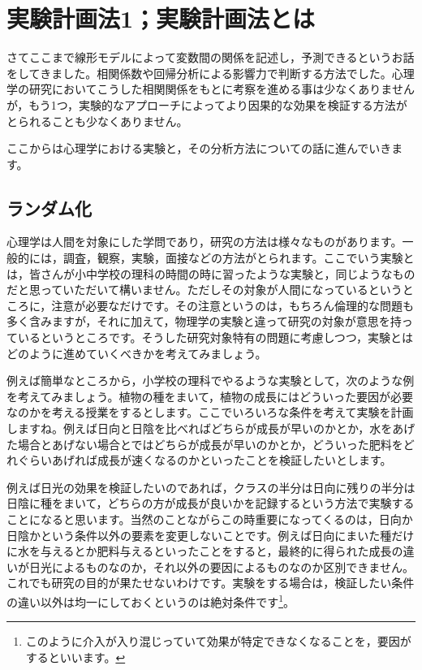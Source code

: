 \documentclass{ltjbook}
\begin{document}
 
\chapter{実験計画法1；実験計画法とは} 
\label{chapter12} 

さてここまで線形モデルによって変数間の関係を記述し，予測できるというお話をしてきました。相関係数や回帰分析による影響力で判断する方法でした。心理学の研究においてこうした相関関係をもとに考察を進める事は少なくありませんが，もう1つ，実験的なアプローチによってより因果的な効果を検証する方法がとられることも少なくありません。

ここからは心理学における実験と，その分析方法についての話に進んでいきます。


\section{ランダム化}
\label{RCT}
心理学は人間を対象にした学問であり，研究の方法は様々なものがあります。一般的には，調査，観察，実験，面接などの方法がとられます。ここでいう実験とは，皆さんが小中学校の理科の時間の時に習ったような実験と，同じようなものだと思っていただいて構いません。ただしその対象が人間になっているというところに，注意が必要なだけです。その注意というのは，もちろん倫理的な問題も多く含みますが，それに加えて，物理学の実験と違って研究の対象が意思を持っているというところです。そうした研究対象特有の問題に考慮しつつ，実験とはどのように進めていくべきかを考えてみましょう。

例えば簡単なところから，小学校の理科でやるような実験として，次のような例を考えてみましょう。植物の種をまいて，植物の成長にはどういった要因が必要なのかを考える授業をするとします。ここでいろいろな条件を考えて実験を計画しますね。例えば日向と日陰を比べればどちらが成長が早いのかとか，水をあげた場合とあげない場合とではどちらが成長が早いのかとか，どういった肥料をどれぐらいあげれば成長が速くなるのかといったことを検証したいとします。

例えば日光の効果を検証したいのであれば，クラスの半分は日向に残りの半分は日陰に種をまいて，どちらの方が成長が良いかを記録するという方法で実験することになると思います。当然のことながらこの時重要になってくるのは，日向か日陰かという条件以外の要素を変更しないことです。例えば日向にまいた種だけに水を与えるとか肥料与えるといったことをすると，最終的に得られた成長の違いが日光によるものなのか，それ以外の要因によるものなのか区別できません。これでも研究の目的が果たせないわけです。実験をする場合は，検証したい条件の違い以外は均一にしておくというのは絶対条件です\footnote{このように介入が入り混じっていて効果が特定できなくなることを，要因がするといいます。}。
\end{document}
